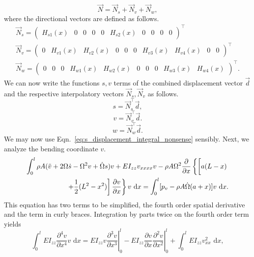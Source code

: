 \begin{equation}
\vec{N} = \vec{N}_s + \vec{N}_v + \vec{N}_w,
\end{equation}
where the directional vectors are defined as follows.
\begin{eqnarray}
\vec{N}_s =
\begin{pmatrix}
H_{s1}(x) & 0 & 0 & 0 & 0 & H_{s2}(x) & 0 & 0 & 0 & 0
\end{pmatrix}^\top \\
\vec{N}_v =
\begin{pmatrix}
0 & H_{v1}(x) & H_{v2}(x) & 0 & 0 & 0 & H_{v3}(x) & H_{v4}(x) & 0 & 0
\end{pmatrix}^\top \\
\vec{N}_w =
\begin{pmatrix}
0 & 0 & 0 & H_{w1}(x) & H_{w2}(x) & 0 & 0 & 0 & H_{w3}(x) & H_{w4}(x)
\end{pmatrix}^\top .
\end{eqnarray}
We can now write the functions $s,v$ terms of the combined displacement vector $\vec d$ and the respective interpolatory vectors $\vec N_s,\vec N_v$ as follows.
\begin{equation}
s = \vec N_s^\top \vec d,
\end{equation}
\begin{equation}
v = \vec N_v^\top \vec d.
\end{equation}
\begin{equation}
w = \vec N_w^\top \vec d.
\end{equation}
We may now use Eqn.~\ref{eq:s_displacement_integral_nonsense} sensibly. Next, we analyze the bending coordinate $v$.
\begin{eqnarray}
\int_0^l\rho A(\ddot v + 2\Omega\dot s-\Omega^2v+\dot\Omega s)v+EI_{zz}v_{xxxx}v-\rho A\Omega^2\frac{\partial}{\partial x}\left\lbrace \left[a(L-x)\vphantom{\frac{1}{2}}\right.\right.\\
\left.\left.+\frac{1}{2}(L^2-x^2)\right]\frac{\partial v}{\partial x}\right\rbrace v\text{ d}x = \int_0^l[p_v - \rho A\dot\Omega(a+x)]v\text{ d}x. \nonumber
\end{eqnarray}
This equation has two terms to be simplified, the fourth order spatial derivative and the term in curly braces. Integration by parts twice on the fourth order term yields
\begin{equation}
\int_0^lEI_{zz}\frac{\partial^4 v}{\partial x^4}v\text{ d}x = \left.EI_{zz}v\frac{\partial^3 v}{\partial x^3}\right|_0^l-\left.EI_{zz}\frac{\partial v}{\partial x}\frac{\partial^2 v}{\partial x^2}\right|_0^l + \int_0^lEI_{zz}v_{xx}^2\text{ d}x,
\label{eq:v.disc.int.by.parts.1}
\end{equation}
